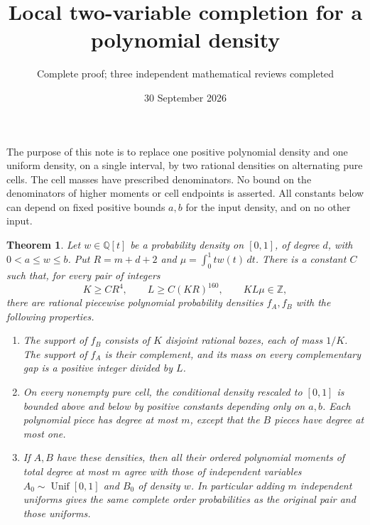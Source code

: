 \documentclass[11pt]{article}
\title{Local two-variable completion for a polynomial density}
\author{Complete proof; three independent mathematical reviews completed}
\date{30 September 2026}
\newtheorem{theorem}{Theorem}
\begin{document}
\maketitle
The purpose of this note is to replace one positive polynomial density
and one uniform density, on a single interval, by two rational densities
on alternating pure cells. The cell masses have prescribed denominators.
No bound on the denominators of higher moments or cell endpoints is asserted.
All constants below can depend on fixed positive bounds $a,b$ for the input
density, and on no other input.

\begin{theorem}\label{main}
Let $w\in\mathbb Q[t]$ be a probability density on $[0,1]$, of degree $d$,
with $0<a\le w\le b$. Put $R=m+d+2$ and
$\mu=\int_0^1t w(t)\,dt$. There is a constant $C$ such that, for every
pair of integers
\[
 K\ge CR^4,\qquad L\ge C(KR)^{160},\qquad KL\mu\in\mathbb Z,
\]
there are rational piecewise polynomial probability densities $f_A,f_B$
with the following properties.
\begin{enumerate}
\item The support of $f_B$ consists of $K$ disjoint rational boxes,
each of mass $1/K$. The support of $f_A$ is their complement, and its
mass on every complementary gap is a positive integer divided by $L$.
\item On every nonempty pure cell, the conditional density rescaled to
$[0,1]$ is bounded above and below by positive constants depending only
on $a,b$. Each polynomial piece has degree at most $m$, except that
the $B$ pieces have degree at most one.
\item If $A,B$ have these densities, then all their ordered polynomial
moments of total degree at most $m$ agree with those of independent
variables $A_0\sim\operatorname{Unif}[0,1]$ and $B_0$ of density $w$.
In particular adding $m$ independent uniforms gives the same complete
order probabilities as the original pair and those uniforms.
\end{enumerate}
\end{theorem}
\end{document}

